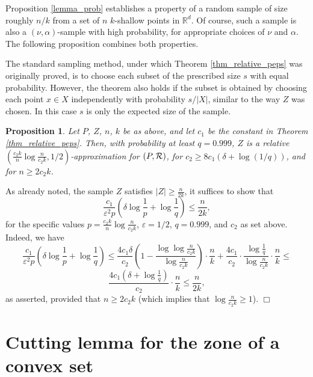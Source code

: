 \documentclass[11pt]{article}
\newtheorem{proposition}[theorem]{Proposition}
{\theorembodyfont{\rm} \newtheorem{defn}[theorem]{Definition}}
\def\reals{\mathbb R}
\def\eps{\varepsilon}
\def\R{\cal{R}}
\begin{document}
Proposition \ref{lemma_prob} establishes a property of a random sample of size roughly $n/k$ from a set of $n$ $k$-shallow points in $\reals^{d}$. Of course, such a sample is also a $(\nu,\alpha)$-sample with high probability, for appropriate choices of $\nu$ and $\alpha$. The following proposition combines both properties.

 The standard sampling method, under which Theorem \ref{thm_relative_peps} was originally proved, is to choose each subset of the prescribed size $s$ with equal probability. However, the theorem also holds if the subset is obtained by choosing each point $x \in X$ independently with probability $s/|X|$, similar to the way $Z$ was chosen. In this case $s$ is only the expected size of the sample.

\begin{proposition} \label{prop_peps}
Let $P$, $Z$, $n$, $k$ be as above, and let $c_{1}$ be the constant in Theorem \ref{thm_relative_peps}. Then, with probability at least $q = 0.999$, $Z$ is a relative $(\frac{c_{2}k}{n}\log\frac{n}{c_{2}k},1/2)$-approximation for $(P,\R)$, for $c_{2} \geq 8 c_{1} (\delta + \log (1/q))$, and for $n \geq 2c_{2}k$.
\end{proposition}

 As already noted, the sample $Z$ satisfies $|Z| \geq \frac{n}{2k}$, it suffices to show that
$$
\frac{c_{1}}{\eps^{2}p}\left(\delta \log \frac{1}{p} + \log \frac{1}{q} \right)  \leq \frac{n}{2k},
$$
for the specific values $p = \frac{c_{2}k}{n}\log\frac{n}{c_{2}k}$, $\eps = 1/2$, $q = 0.999$, and $c_{2}$ as set above. Indeed, we have
$$
\frac{c_{1}}{\eps^{2}p}\left(\delta \log \frac{1}{p} + \log \frac{1}{q} \right) \leq
\frac{4 c_{1} \delta}{c_{2}} \left(1 - \frac{\log \log \frac{n}{c_{2}k}}{\log \frac{n}{c_{2} k}}\right) \cdot \frac{n}{k} + \frac{4 c_{1}}{c_{2}} \cdot \frac{\log \frac{1}{q}}{\log \frac{n}{c_{2} k}} \cdot \frac{n}{k} \leq
$$
$$
\frac{4 c_{1}(\delta + \log \frac{1}{q})}{c_{2}} \cdot \frac{n}{k} \leq \frac{n}{2k},
$$
as asserted, provided that $n \geq 2 c_{2} k$ (which implies that $\log \frac{n}{c_{2} k} \geq 1$). $\Box$




\section{Cutting lemma for the zone of a convex set} \label{section_cutting_lemma}
\end{document}
